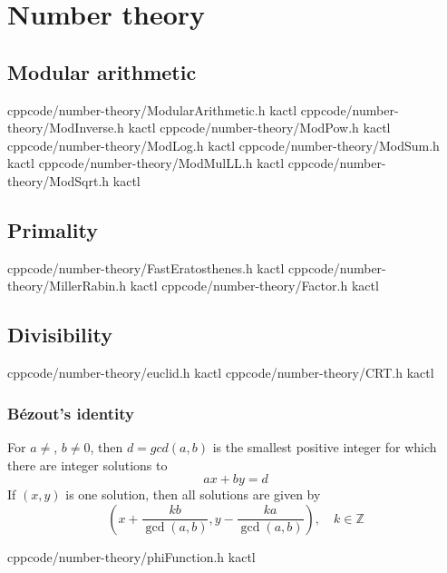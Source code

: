 \chapter{Number theory}

\section{Modular arithmetic}
    {}{}
    {cpp}{code/number-theory/ModularArithmetic.h}
    {kactl}
    {}{}
    {cpp}{code/number-theory/ModInverse.h}
    {kactl}
    {}{}
    {cpp}{code/number-theory/ModPow.h}
    {kactl}
    {}{}
    {cpp}{code/number-theory/ModLog.h}
    {kactl}
    {}{}
    {cpp}{code/number-theory/ModSum.h}
    {kactl}
    {}{}
    {cpp}{code/number-theory/ModMulLL.h}
    {kactl}
    {}{}
    {cpp}{code/number-theory/ModSqrt.h}
    {kactl}

\section{Primality}
    {}{}
    {cpp}{code/number-theory/FastEratosthenes.h}
    {kactl}
    {}{}
    {cpp}{code/number-theory/MillerRabin.h}
    {kactl}
    {}{}
    {cpp}{code/number-theory/Factor.h}
    {kactl}

\section{Divisibility}
    {}{}
    {cpp}{code/number-theory/euclid.h}
    {kactl}
    {}{}
    {cpp}{code/number-theory/CRT.h}
    {kactl}

	\subsection{Bézout's identity}
	For $a \neq $, $b \neq 0$, then $d=gcd(a,b)$ is the smallest positive integer for which there are integer solutions to
	$$ax+by=d$$
	If $(x,y)$ is one solution, then all solutions are given by
	$$\left(x+\frac{kb}{\gcd(a,b)}, y-\frac{ka}{\gcd(a,b)}\right), \quad k\in\mathbb{Z}$$

    {}{}
    {cpp}{code/number-theory/phiFunction.h}
    {kactl}

